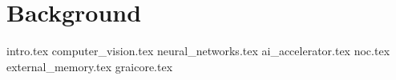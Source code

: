 \chapter{Background}
\label{ch:2}
{intro.tex}
{computer_vision.tex}
{neural_networks.tex}
{ai_accelerator.tex}
{noc.tex}
{external_memory.tex}
{graicore.tex}



